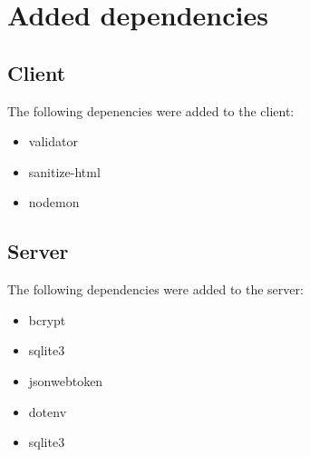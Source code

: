 \documentclass[a4paper]{article}
\begin{document}
\section{Added dependencies}
\subsection{Client}
The following depenencies were added to the client:
\begin{itemize}
    \item validator
    \item sanitize-html
    \item nodemon
\end{itemize}
\subsection{Server}
The following dependencies were added to the server:
\begin{itemize}
    \item bcrypt
    \item sqlite3
    \item jsonwebtoken
    \item dotenv
    \item sqlite3
\end{itemize}
\end{document}
